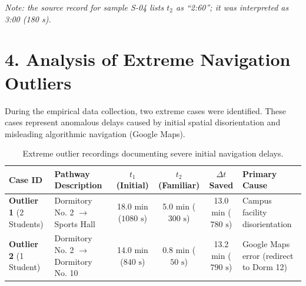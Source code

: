 \documentclass[11pt, a4paper]{article}
\begin{document}
\noindent\textit{Note: the source record for sample S-04 lists $t_2$ as ``2:60''; it was interpreted as 3:00 (180 s).}

\newpage


\section*{4. Analysis of Extreme Navigation Outliers}

During the empirical data collection, two extreme cases were identified. These cases represent anomalous delays caused by initial spatial disorientation and misleading algorithmic navigation (Google Maps).

\vspace{0.5em}

\begin{table}[h!]
\centering
\small
\begin{tabular}{p{2.0cm} p{3.2cm} c c c p{2.6cm}}
\toprule
\textbf{Case ID} & \textbf{Pathway Description} & \textbf{$t_1$ (Initial)} & \textbf{$t_2$ (Familiar)} & \textbf{$\Delta t$ Saved} & \textbf{Primary Cause} \\
\midrule
\textbf{Outlier 1} \newline (2 Students) & Dormitory No. 2 $\rightarrow$ Sports Hall & 18.0 min \newline ($1080\text{ s}$) & 5.0 min \newline ($300\text{ s}$) & 13.0 min \newline ($780\text{ s}$) & Campus facility disorientation \\
\midrule
\textbf{Outlier 2} \newline (1 Student) & Dormitory No. 2 $\rightarrow$ Dormitory No. 10 & 14.0 min \newline ($840\text{ s}$) & 0.8 min \newline ($50\text{ s}$) & 13.2 min \newline ($790\text{ s}$) & Google Maps error (redirect to Dorm 12) \\
\bottomrule
\end{tabular}
\caption{Extreme outlier recordings documenting severe initial navigation delays.}
\end{table}

\vspace{0.5em}
\end{document}
